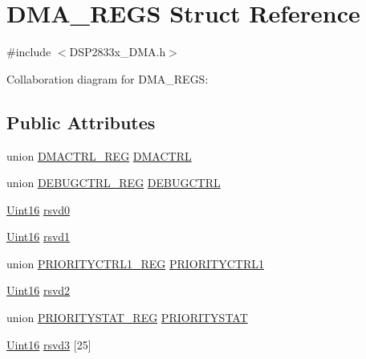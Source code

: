 \hypertarget{struct_d_m_a___r_e_g_s}{}\section{D\+M\+A\+\_\+\+R\+E\+G\+S Struct Reference}
\label{struct_d_m_a___r_e_g_s}


{\ttfamily \#include $<$D\+S\+P2833x\+\_\+\+D\+M\+A.\+h$>$}



Collaboration diagram for D\+M\+A\+\_\+\+R\+E\+G\+S\+:
\subsection*{Public Attributes}
\begin{DoxyCompactItemize}
\item 
union \hyperlink{union_d_m_a_c_t_r_l___r_e_g}{D\+M\+A\+C\+T\+R\+L\+\_\+\+R\+E\+G} \hyperlink{struct_d_m_a___r_e_g_s_a9823fc4d7b594208d8e216eb19ed649c}{D\+M\+A\+C\+T\+R\+L}
\item 
union \hyperlink{union_d_e_b_u_g_c_t_r_l___r_e_g}{D\+E\+B\+U\+G\+C\+T\+R\+L\+\_\+\+R\+E\+G} \hyperlink{struct_d_m_a___r_e_g_s_a2409ad5399be6b14c47b1340b6eaa70f}{D\+E\+B\+U\+G\+C\+T\+R\+L}
\item 
\hyperlink{_d_s_p2833x___device_8h_a59a9f6be4562c327cbfb4f7e8e18f08b}{Uint16} \hyperlink{struct_d_m_a___r_e_g_s_a7913eb95a505bf1607f3f9ddd14ba088}{rsvd0}
\item 
\hyperlink{_d_s_p2833x___device_8h_a59a9f6be4562c327cbfb4f7e8e18f08b}{Uint16} \hyperlink{struct_d_m_a___r_e_g_s_a6d1bb8f80e16e2e1ba7446ea44a39de6}{rsvd1}
\item 
union \hyperlink{union_p_r_i_o_r_i_t_y_c_t_r_l1___r_e_g}{P\+R\+I\+O\+R\+I\+T\+Y\+C\+T\+R\+L1\+\_\+\+R\+E\+G} \hyperlink{struct_d_m_a___r_e_g_s_a37206198761d986d0dd1a9588b54894f}{P\+R\+I\+O\+R\+I\+T\+Y\+C\+T\+R\+L1}
\item 
\hyperlink{_d_s_p2833x___device_8h_a59a9f6be4562c327cbfb4f7e8e18f08b}{Uint16} \hyperlink{struct_d_m_a___r_e_g_s_af11472d9ce8b6e37382b1dc5c0d28b22}{rsvd2}
\item 
union \hyperlink{union_p_r_i_o_r_i_t_y_s_t_a_t___r_e_g}{P\+R\+I\+O\+R\+I\+T\+Y\+S\+T\+A\+T\+\_\+\+R\+E\+G} \hyperlink{struct_d_m_a___r_e_g_s_acf8c2a2efed271a318f499d5788653f5}{P\+R\+I\+O\+R\+I\+T\+Y\+S\+T\+A\+T}
\item 
\hyperlink{_d_s_p2833x___device_8h_a59a9f6be4562c327cbfb4f7e8e18f08b}{Uint16} \hyperlink{struct_d_m_a___r_e_g_s_a564f87c05e41d51e2d68aebf687e33c3}{rsvd3} \mbox{[}25\mbox{]}

\end{DoxyCompactItemize}
